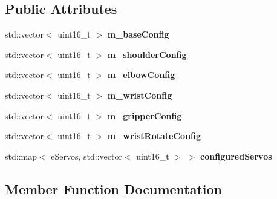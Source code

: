 \subsection*{Public Attributes}
\begin{DoxyCompactItemize}
\item 
\mbox{\label{classCConfiguration_a645da54104ece59e51075625f2154fa6}} 
std\+::vector$<$ uint16\+\_\+t $>$ {\bfseries m\+\_\+base\+Config}
\item 
\mbox{\label{classCConfiguration_a6ad827aa986b7ee1edbb0bb54396e2f4}} 
std\+::vector$<$ uint16\+\_\+t $>$ {\bfseries m\+\_\+shoulder\+Config}
\item 
\mbox{\label{classCConfiguration_a70b950d039f075e4ca742fb3ca2b0af6}} 
std\+::vector$<$ uint16\+\_\+t $>$ {\bfseries m\+\_\+elbow\+Config}
\item 
\mbox{\label{classCConfiguration_a1a20f4e7ea30bc5d1876a5ee378e050f}} 
std\+::vector$<$ uint16\+\_\+t $>$ {\bfseries m\+\_\+wrist\+Config}
\item 
\mbox{\label{classCConfiguration_a2152fd07d542414360636f1ffd658dd4}} 
std\+::vector$<$ uint16\+\_\+t $>$ {\bfseries m\+\_\+gripper\+Config}
\item 
\mbox{\label{classCConfiguration_ac07b6f1cc76bc4cd1cba91964c69a3d4}} 
std\+::vector$<$ uint16\+\_\+t $>$ {\bfseries m\+\_\+wrist\+Rotate\+Config}
\item 
\mbox{\label{classCConfiguration_adb298b77ce31aab113916880beb973e0}} 
std\+::map$<$ e\+Servos, std\+::vector$<$ uint16\+\_\+t $>$ $>$ {\bfseries configured\+Servos}
\end{DoxyCompactItemize}


\subsection{Member Function Documentation}
\mbox{\label{classCConfiguration_a802c3702798ee1dd456d663530da89d0}} 
